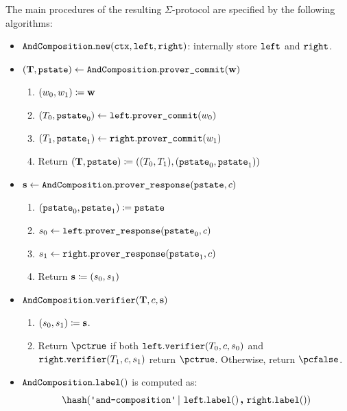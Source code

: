 \documentclass[11pt]{article}
\begin{document}
The main procedures of the resulting $\Sigma$-protocol are specified by the following algorithms:
\begin{itemize}
  \item
  $\texttt{AndComposition}.\texttt{new}(\texttt{ctx}, \texttt{left}, \texttt{right})$: internally store $\texttt{left}$ and $\texttt{right}$.
  \item
  $(\mathbf {T}, \texttt{pstate})\gets \texttt{AndComposition}.\texttt{prover\_commit}(\mathbf {w})$
    \begin{enumerate}
      \item
        $(w_0,w_1)\coloneqq \mathbf {w}$
      \item
        $(T_0,\texttt{pstate}_0)\gets\texttt{left}.\texttt{prover\_commit}(w_0)$
      \item $(T_1,\texttt{pstate}_1)\gets\texttt{right}.\texttt{prover\_commit}(w_1)$
      \item
	Return $(\mathbf {T},\texttt{pstate}) \coloneqq ((T_0,  T_1),(\texttt{pstate}_0,\texttt{pstate}_1))$
    \end{enumerate}
  \item
  $\mathbf {s} \gets \texttt{AndComposition}.\texttt{prover\_response}(\texttt{pstate}, c)$
  \begin{enumerate}
      \item
	    $(\texttt{pstate}_0,\texttt{pstate}_1)\coloneqq \texttt{pstate}$
      \item
      $s_0\gets\texttt{left}.\texttt{prover\_response}(\texttt{pstate}_0, c)$
      \item
      $s_1\gets\texttt{right}.\texttt{prover\_response}(\texttt{pstate}_1, c)$
      \item
      Return $\mathbf {s}\coloneqq(s_0,s_1)$
    \end{enumerate}
  \item
  $\texttt{AndComposition}.\texttt{verifier}(\mathbf {T}, c, \mathbf {s})$
  \begin{enumerate}
      \item
        $(s_0,s_1)\coloneqq \mathbf {s}$.
      \item
	Return $\accept$ if both $\texttt{left}.\texttt{verifier}(T_0,c, s_0)$ and $\texttt{right}.\texttt{verifier}(T_1,c, s_1)$ return $\accept$. Otherwise, return $\reject$.
    \end{enumerate}
  \item  $\texttt{AndComposition}.\texttt{label}()$ is computed as:
    \[
     \hash(\andlabel \concatblock \leftbranch.\labeltt() \concat \rightbranch.\labeltt())
\]
\end{itemize}
\end{document}
